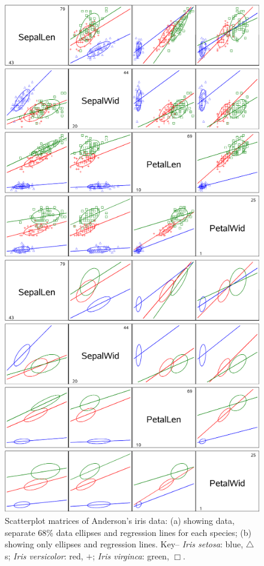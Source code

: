\documentclass[11pt]{article}%
\begin{document}
\begin{figure}[htb]
  \begin{minipage}[c]{.485\textwidth}
   \includegraphics[width=1\linewidth,clip]{fig/scatirisd1}
   \end{minipage}%
  \hfill
  \begin{minipage}[c]{.485\textwidth}
   \includegraphics[width=1\linewidth,clip]{fig/scatirisd3}
  \end{minipage}
  \caption{Scatterplot matrices of Anderson's iris data: (a) showing data, separate 68\% data
  ellipses and regression lines for each species; (b) showing only ellipses and regression lines.
  Key-- \emph{Iris setosa}: blue, $\triangle$s; \emph{Iris versicolor}: red, $+$;
  \emph{Iris virginca}: green, $\Box$.}%
  \label{fig:scatirisd1}
\end{figure}
\end{document}
